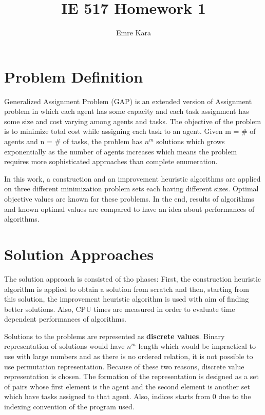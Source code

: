 \documentclass[11pt]{article}
\author{Emre Kara}
\title{IE 517 Homework 1}
\begin{document}
    
    \maketitle

    \hypertarget{def}{%
\section{Problem Definition}\label{def}}

Generalized Assignment Problem (GAP) is an extended version of Assignment problem in which each agent has some capacity and each task assignment has some size and cost varying among agents and tasks. The objective of the problem is to minimize total cost while assigning each task to an agent. Given m = # of agents and n = # of tasks, the problem has $n^m$ solutions which grows exponentially as the number of agents increases which means the problem requires more sophisticated approaches than complete enumeration.

In this work, a construction and an improvement heuristic algorithms are applied on three different minimization problem sets each having different sizes. Optimal objective values are known for these problems. In the end, results of algorithms and known optimal values are compared to have an idea about performances of algorithms.

    \hypertarget{approach}{%
\section{Solution Approaches}\label{approach}}
The solution approach is consisted of tho phases: First, the construction heuristic algorithm is applied to obtain a solution from scratch and then, starting from this solution, the improvement heuristic algorithm is used with aim of finding better solutions. Also, CPU times are measured in order to evaluate time dependent performances of algorithms.

Solutions to the problems are represented as \textbf{discrete values}. Binary representation of solutions would have $n^m$ length which would be impractical to use with large numbers and as there is no ordered relation, it is not possible to use permutation representation. Because of these two reasons, discrete value representation is chosen. The formation of the representation is designed as a set of pairs whose first element is the agent and the second element is another set which have tasks assigned to that agent. Also, indices starts from 0 due to the indexing convention of the program used.
\end{document}
